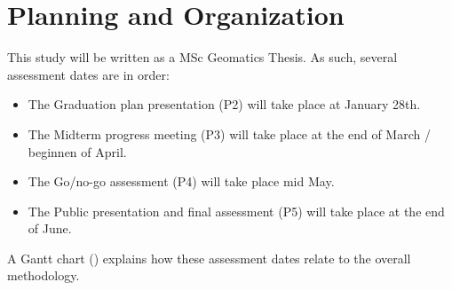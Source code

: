 \newpage
\section{Planning and Organization}

This study will be written as a MSc Geomatics Thesis. As such, several assessment dates are in order:   

\begin{itemize}
    \item The Graduation plan presentation (P2) will take place at January 28th. 
    \item The Midterm progress meeting  (P3) will take place at the end of March / beginnen of April. 
    \item The Go/no-go assessment (P4) will take place mid May.
    \item The Public presentation and final assessment (P5) will take place at the end of June.
\end{itemize}

A Gantt chart () explains how these assessment dates relate to the overall methodology.




